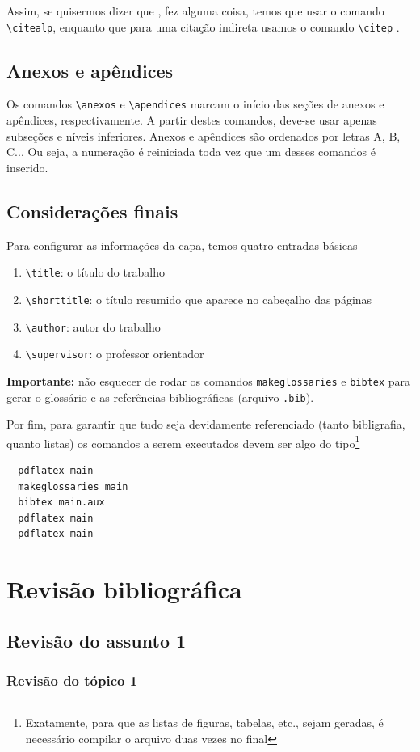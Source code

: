 \documentclass[portugues]{automatex}
\begin{document}
Assim, se quisermos dizer que \citealp{big}, fez alguma coisa, temos que usar o comando \verb+\citealp+,
enquanto que para uma citação indireta usamos o comando \verb+\citep+ \citep{big}.

\subsection{Anexos e apêndices}

Os comandos \verb+\anexos+ e \verb+\apendices+ marcam o início das seções de anexos e apêndices, respectivamente. A partir destes comandos, deve-se usar apenas subseções e níveis inferiores. Anexos e apêndices são ordenados por letras A, B, C... Ou seja, a numeração é reiniciada toda vez que um desses comandos é inserido.

\subsection{Considerações finais}

Para configurar as informações da capa, temos quatro entradas básicas
\begin{enumerate}
  \item \verb+\title+: o título do trabalho
  \item \verb+\shorttitle+: o título resumido que aparece no cabeçalho das páginas
  \item \verb+\author+: autor do trabalho
  \item \verb+\supervisor+: o professor orientador
\end{enumerate}

\textbf{Importante:} não esquecer de rodar os comandos \verb+makeglossaries+ e \verb+bibtex+ para gerar o glossário e as referências bibliográficas (arquivo \verb+.bib+).

Por fim, para garantir que tudo seja devidamente referenciado (tanto bibligrafia, quanto listas) os comandos a serem executados devem ser algo do tipo\footnote{Exatamente, para que as listas de figuras, tabelas, etc., sejam geradas, é necessário compilar o arquivo duas vezes no final}
\begin{verbatim}
  pdflatex main
  makeglossaries main
  bibtex main.aux
  pdflatex main
  pdflatex main
\end{verbatim}

\section{Revisão bibliográfica}

\lipsum[10]

\subsection{Revisão do assunto 1}

\lipsum[11]

\subsubsection{Revisão do tópico 1}

\lipsum[12]


\end{document}
